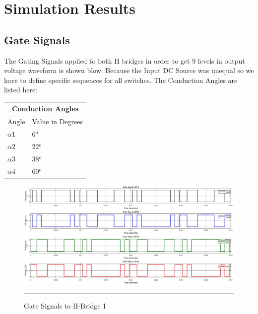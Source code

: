 
\chapter{Simulation Results} %
\label{Chapter5}
\section{Gate Signals}
The Gating Signals applied to both H bridges in order to get 9 levels in output voltage waveform is shown blow. Because the Input DC Source was unequal so we have to define specific sequences for all switches. The Conduction Angles are listed here:
\begin{center}
	\begin{tabular}{ |p{4cm}||p{4cm}|  }
		\hline
		\multicolumn{2}{|c|}{Conduction Angles} \\
		\hline
		Angle & Value in Degrees\\
		\hline
		$\alpha1$ & 6$^o$\\
		\hline
		$\alpha2$ & 22$^o$\\
		\hline
		$\alpha3$ & 38$^o$\\
		\hline
		$\alpha4$ & 60$^o$\\
		\hline
	\end{tabular}
\end{center}

\begin{figure}[htbp]
	\centering
	\includegraphics[width = 6in]{./Figures/Photos/Simulink/GateSignal1.jpg}
	\rule{35em}{1pt}
	\caption{Gate Signals to H-Bridge 1}
\end{figure}

